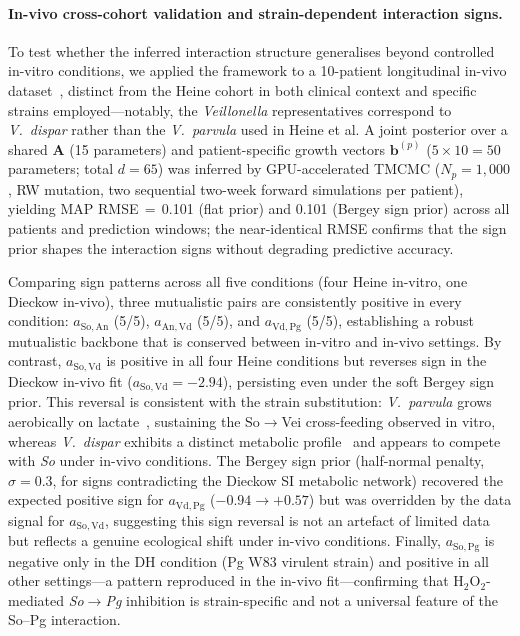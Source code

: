 \documentclass[11pt,a4paper]{article}
\begin{document}
\paragraph{In-vivo cross-cohort validation and strain-dependent interaction signs.}
To test whether the inferred interaction structure generalises beyond controlled in-vitro conditions, we applied the framework to a 10-patient longitudinal in-vivo dataset~\cite{Dieckow2025InVivo}, distinct from the Heine cohort in both clinical context and specific strains employed---notably, the \textit{Veillonella} representatives correspond to \textit{V.~dispar} rather than the \textit{V.~parvula} used in Heine et al.
A joint posterior over a shared $\mathbf{A}$ (15 parameters) and patient-specific growth vectors $\mathbf{b}^{(p)}$ ($5\times10=50$ parameters; total $d=65$) was inferred by GPU-accelerated TMCMC ($N_p=1{,}000$, RW mutation, two sequential two-week forward simulations per patient), yielding MAP RMSE\,$=$\,0.101 (flat prior) and 0.101 (Bergey sign prior) across all patients and prediction windows; the near-identical RMSE confirms that the sign prior shapes the interaction signs without degrading predictive accuracy.

Comparing sign patterns across all five conditions (four Heine in-vitro, one Dieckow in-vivo), three mutualistic pairs are consistently positive in every condition: $a_{\mathrm{So,An}}$ (5/5), $a_{\mathrm{An,Vd}}$ (5/5), and $a_{\mathrm{Vd,Pg}}$ (5/5), establishing a robust mutualistic backbone that is conserved between in-vitro and in-vivo settings.
By contrast, $a_{\mathrm{So,Vd}}$ is positive in all four Heine conditions but reverses sign in the Dieckow in-vivo fit ($a_{\mathrm{So,Vd}}=-2.94$), persisting even under the soft Bergey sign prior.
This reversal is consistent with the strain substitution: \textit{V.~parvula} grows aerobically on lactate~\cite{Bergey2009}, sustaining the So$\to$Vei cross-feeding observed in vitro, whereas \textit{V.~dispar} exhibits a distinct metabolic profile~\cite{Rogosa1965Veillonella} and appears to compete with \textit{So} under in-vivo conditions.
The Bergey sign prior (half-normal penalty, $\sigma=0.3$, for signs contradicting the Dieckow SI metabolic network) recovered the expected positive sign for $a_{\mathrm{Vd,Pg}}$ ($-0.94\to+0.57$) but was overridden by the data signal for $a_{\mathrm{So,Vd}}$, suggesting this sign reversal is not an artefact of limited data but reflects a genuine ecological shift under in-vivo conditions.
Finally, $a_{\mathrm{So,Pg}}$ is negative only in the DH condition (Pg W83 virulent strain) and positive in all other settings---a pattern reproduced in the in-vivo fit---confirming that H$_2$O$_2$-mediated \textit{So}$\to$\textit{Pg} inhibition is strain-specific and not a universal feature of the So--Pg interaction.
\end{document}
